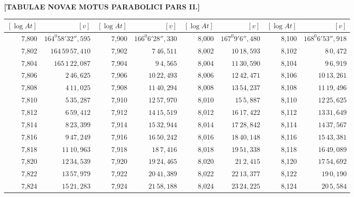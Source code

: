 \clearpage
{}
\begingroup
\centering
\fontsize{9}{9}\selectfont
\setlength{\tabcolsep}{.2pt}
\renewcommand{\arraystretch}{.9}
\setlength{\parskip}{0pt}
\textbf{[TABULAE NOVAE MOTUS PARABOLICI PARS II.]}
\par\vspace{7pt}
\begin{tabular}{|r|r||r|r||r|r||r|r|}
\hline
\([\log At]\) & \([v]\) & \([\log At]\) & \([v]\) & \([\log At]\) & \([v]\) & \([\log At]\) & \([v]\) \\
\hline
7,800 & \(164^{0}58'32'',\!595\) & 7,900 & \(166^{0}6'28'',\!330\) & 8,000 & \(167^{0}9'6'',\!480\) & 8,100 & \(168^{0}6'53'',\!918\) \\[1pt]
7,802 & \(164\,59\,57,\!410\) & 7,902 & \(7\,46,\!511\) & 8,002 & \(10\,18,\!593\) & 8,102 & \(8\,0,\!472\) \\
7,804 & \(165\,1\,22,\!087\) & 7,904 & \(9\,4,\!565\) & 8,004 & \(11\,30,\!590\) & 8,104 & \(9\,6,\!919\) \\
7,806 & \(2\,46,\!625\) & 7,906 & \(10\,22,\!493\) & 8,006 & \(12\,42,\!471\) & 8,106 & \(10\,13,\!261\) \\
7,808 & \(4\,11,\!025\) & 7,908 & \(11\,40,\!294\) & 8,008 & \(13\,54,\!237\) & 8,108 & \(11\,19,\!496\) \\
7,810 & \(5\,35,\!287\) & 7,910 & \(12\,57,\!970\) & 8,010 & \(15\,5,\!887\) & 8,110 & \(12\,25,\!625\) \\[1pt]
7,812 & \(6\,59,\!412\) & 7,912 & \(14\,15,\!519\) & 8,012 & \(16\,17,\!422\) & 8,112 & \(13\,31,\!649\) \\
7,814 & \(8\,23,\!399\) & 7,914 & \(15\,32,\!944\) & 8,014 & \(17\,28,\!842\) & 8,114 & \(14\,37,\!567\) \\
7,816 & \(9\,47,\!249\) & 7,916 & \(16\,50,\!242\) & 8,016 & \(18\,40,\!148\) & 8,116 & \(15\,43,\!381\) \\
7,818 & \(11\,10,\!963\) & 7,918 & \(18\,7,\!416\) & 8,018 & \(19\,51,\!338\) & 8,118 & \(16\,49,\!089\) \\
7,820 & \(12\,34,\!539\) & 7,920 & \(19\,24,\!465\) & 8,020 & \(21\,2,\!415\) & 8,120 & \(17\,54,\!692\) \\[1pt]
7,822 & \(13\,57,\!979\) & 7,922 & \(20\,41,\!389\) & 8,022 & \(22\,13,\!377\) & 8,122 & \(19\,0,\!190\) \\
7,824 & \(15\,21,\!283\) & 7,924 & \(21\,58,\!188\) & 8,024 & \(23\,24,\!225\) & 8,124 & \(20\,5,\!584\) \\

\end{tabular}
